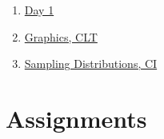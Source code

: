 \documentclass[]{book}
\providecommand{\tightlist}{%
  \setlength{\itemsep}{0pt}\setlength{\parskip}{0pt}}
\providecommand{\tightlist}{%
  \setlength{\itemsep}{0pt}\setlength{\parskip}{0pt}}
\theoremstyle{definition}
\theoremstyle{definition}
\theoremstyle{definition}
\theoremstyle{remark}
\begin{document}
\begin{enumerate}
\def\labelenumi{\arabic{enumi}.}
\tightlist
\item
  \href{https://github.com/sahirbhatnagar/EPIB607/raw/master/polls/001_day1_basic_concepts/001-day1.pdf}{Day
  1}
\item
  \href{https://github.com/sahirbhatnagar/EPIB607/raw/master/polls/002_viz_hist_clt/002-viz-hist-clt.pdf}{Graphics,
  CLT}
\item
  \href{https://github.com/sahirbhatnagar/EPIB607/raw/master/polls/003_sampling_dist_CI/003-sampling-dist-CI.pdf}{Sampling
  Distributions, CI}
\end{enumerate}

\chapter{Assignments}\label{assignments}
\end{document}
